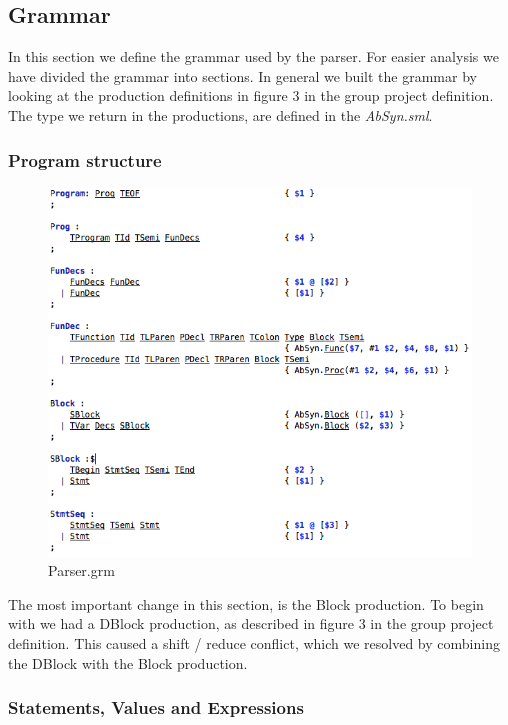 \documentclass[12pt,a4paper,english]{article}
\begin{document}
\pagebreak
\subsection{Grammar}

In this section we define the grammar used by the parser. For easier analysis we have divided the grammar into sections.
In general we built the grammar by looking at the production definitions in figure 3 in the group project definition. The type we return in the productions, are defined in the \textit{AbSyn.sml}. 

\subsubsection{Program structure}

\begin{figure}[h]\includegraphics[width=15cm]{program_structure.png}\caption{Parser.grm}\end{figure}
The most important change in this section, is the Block production. To begin with we had a DBlock production, as described in figure 3 in the group project definition. This caused a shift / reduce conflict, which we resolved by combining the DBlock with the Block production. 

\pagebreak

\subsubsection{Statements, Values and Expressions}
\end{document}
